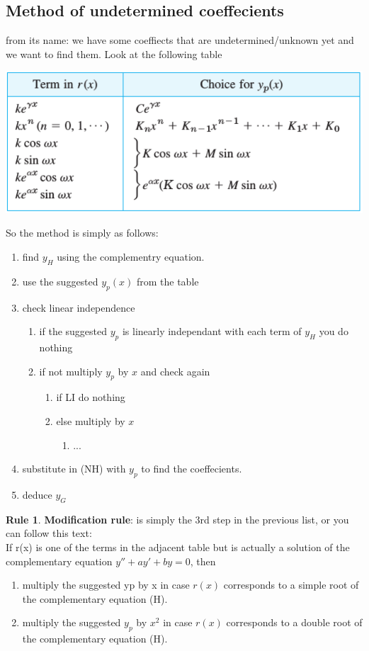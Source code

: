 \documentclass[11pt]{article}
\theoremstyle{definition}
\newtheorem{reg}{Rule}
\begin{document}
\subsection{Method of undetermined coeffecients}
from its name: we have some coeffiects that are undetermined/unknown yet and we want to find them. Look at the following table 
\begin{center}
    \includegraphics[scale=0.45]{images/undet.png}
\end{center}
So the method is simply as follows: 
\begin{enumerate}
    \item find $y_H$ using the complementry equation.
\item use the suggested $y_p(x)$ from the table
\item check linear independence 
\begin{enumerate}
    \item if the suggested $y_p$ is linearly independant with each term of $y_H$ you do nothing
    \item if not multiply $y_p$ by $x$ and check again
    \begin{enumerate}
        \item if LI do nothing
        \item else multiply by $x$
        \begin{enumerate}
            \item ...
        \end{enumerate}
    \end{enumerate}
\end{enumerate}
\item substitute in (NH) with $y_p$ to find the coeffecients.
\item deduce $y_G$
\end{enumerate}
\begin{reg}
\textbf{Modification rule}: is simply the 3rd step in the previous list, or you can follow this text: \\
If r(x) is one of the terms in the adjacent table but is actually a solution of the complementary equation $y'' + ay' + by = 0$, then \begin{enumerate}
    \item multiply the suggested yp by x in case $r(x)$ corresponds to a simple root of the complementary equation (H).
    \item multiply the suggested $y_p$ by $x^2$ in case $r(x)$ corresponds to a double root of the complementary equation (H).
\end{enumerate} 

\end{reg}
\end{document}

